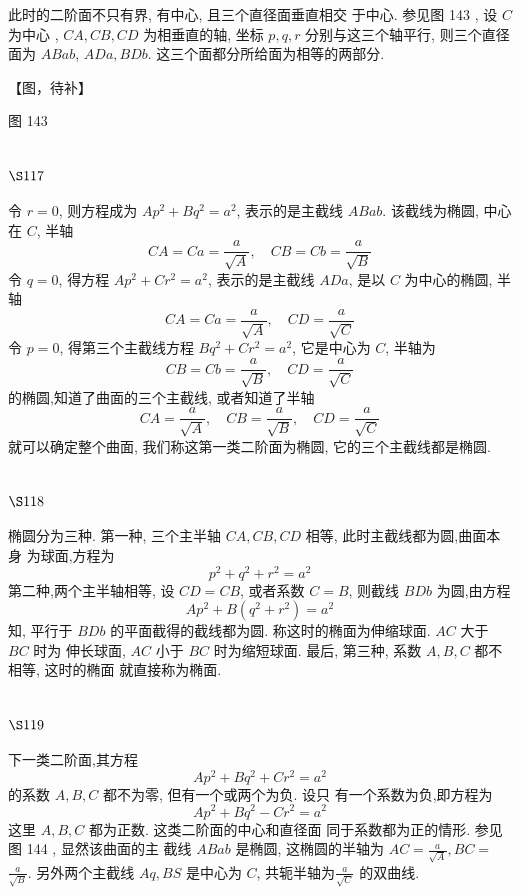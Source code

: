 此时的二阶面不只有界, 有中心, 且三个直径面垂直相交 于中心. 参见图 143 , 设 $C$ 为中心 , $C A, C B, C D$ 为相垂直的轴, 坐标 $p, q, r$ 分别与这三个轴平行, 则三个直径面为 $A B a b$, $A D a, B D b$. 这三个面都分所给面为相等的两部分.


【图，待补】

图 143

\section{$\S 117$}

令 $r=0$, 则方程成为 $A p^{2}+B q^{2}=a^{2}$, 表示的是主截线 $A B a b$. 该截线为椭圆, 中心在 $C$, 半轴
\[
C A=C a=\frac{a}{\sqrt{A}}, \quad C B=C b=\frac{a}{\sqrt{B}}
\]
令 $q=0$, 得方程 $A p^{2}+C r^{2}=a^{2}$, 表示的是主截线 $A D a$, 是以 $C$ 为中心的椭圆, 半轴
\[
C A=C a=\frac{a}{\sqrt{A}}, \quad C D=\frac{a}{\sqrt{C}}
\]
令 $p=0$, 得第三个主截线方程 $B q^{2}+C r^{2}=a^{2}$, 它是中心为 $C$, 半轴为
\[
C B=C b=\frac{a}{\sqrt{B}}, \quad C D=\frac{a}{\sqrt{C}}
\]
的椭圆,知道了曲面的三个主截线, 或者知道了半轴
\[
C A=\frac{a}{\sqrt{A}}, \quad C B=\frac{a}{\sqrt{B}}, \quad C D=\frac{a}{\sqrt{C}}
\]
就可以确定整个曲面, 我们称这第一类二阶面为椭圆, 它的三个主截线都是椭圆. 

\section{$\S 118$}

椭圆分为三种. 第一种, 三个主半轴 $C A, C B, C D$ 相等, 此时主截线都为圆,曲面本身 为球面,方程为
\[
p^{2}+q^{2}+r^{2}=a^{2}
\]
第二种,两个主半轴相等, 设 $C D=C B$, 或者系数 $C=B$, 则截线 $B D b$ 为圆,由方程
\[
A p^{2}+B\left(q^{2}+r^{2}\right)=a^{2}
\]
知, 平行于 $B D b$ 的平面截得的截线都为圆. 称这时的椭面为伸缩球面. $A C$ 大于 $B C$ 时为 伸长球面, $A C$ 小于 $B C$ 时为缩短球面. 最后, 第三种, 系数 $A, B, C$ 都不相等, 这时的椭面 就直接称为椭面.

\section{$\S 119$}

下一类二阶面,其方程
\[
A p^{2}+B q^{2}+C r^{2}=a^{2}
\]
的系数 $A, B, C$ 都不为零, 但有一个或两个为负. 设只 有一个系数为负,即方程为
\[
A p^{2}+B q^{2}-C r^{2}=a^{2}
\]
这里 $A, B, C$ 都为正数. 这类二阶面的中心和直径面 同于系数都为正的情形. 参见图 144 , 显然该曲面的主 截线 $A B a b$ 是椭圆, 这椭圆的半轴为 $A C=\frac{a}{\sqrt{A}}, B C=$ $\frac{a}{\sqrt{B}}$. 另外两个主截线 $A q, B S$ 是中心为 $C$, 共轭半轴为$\frac{a}{\sqrt{C}}$ 的双曲线.


